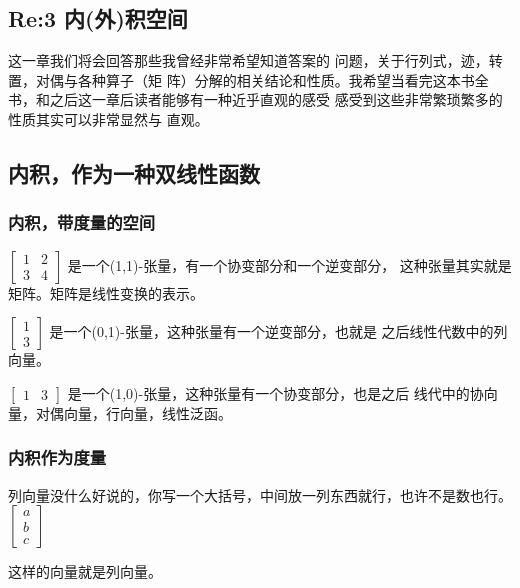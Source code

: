 \documentclass{book}
\begin{document}
\begin{CJK}{UTF8}{gbsn}
    \chapter{Re:3 内(外)积空间}

    这一章我们将会回答那些我曾经非常希望知道答案的
    问题，关于行列式，迹，转置，对偶与各种算子（矩
    阵）分解的相关结论和性质。我希望当看完这本书全
    书，和之后这一章后读者能够有一种近乎直观的感受
    感受到这些非常繁琐繁多的性质其实可以非常显然与
    直观。

    \section{内积，作为一种双线性函数}
    \subsection{内积，带度量的空间}

    $\left[\begin{matrix}
                1 & 2 \\
                3 & 4
            \end{matrix}\right]$
    是一个(1,1)-张量，有一个协变部分和一个逆变部分，
    这种张量其实就是矩阵。矩阵是线性变换的表示。

    $\left[\begin{matrix}
                1 \\
                3
            \end{matrix}\right]$
    是一个(0,1)-张量，这种张量有一个逆变部分，也就是
    之后线性代数中的列向量。

    $\left[\begin{matrix}
                1 & 3
            \end{matrix}\right]$
    是一个(1,0)-张量，这种张量有一个协变部分，也是之后
    线代中的协向量，对偶向量，行向量，线性泛函。

    \subsection{内积作为度量}
    列向量没什么好说的，你写一个大括号，中间放一列东西就行，也许不是数也行。
    $\left[\begin{matrix}
                a \\
                b \\
                c
            \end{matrix}\right]$

    这样的向量就是列向量。


\end{CJK}
\end{document}
